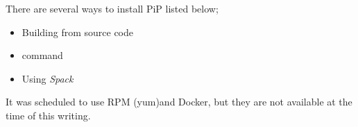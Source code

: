 
There are several ways to install PiP listed below;

\begin{itemize}
\item Building from source code
\item {} command
\item Using \em{Spack}
\end{itemize}

It was scheduled to use RPM (yum)and Docker, but 
they are not available at the time of this writing.
